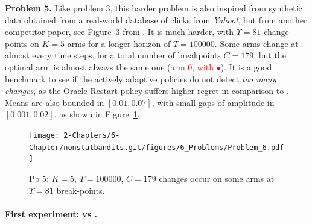\textbf{Problem 5.}
%
Like problem $3$, this harder problem is also inspired from synthetic data obtained from a real-world database of clicks from \emph{Yahoo!}, but from another competitor paper, see Figure~3 from \cite{LiuLeeShroff17}.
%
It is much harder, with $\Upsilon=81$ change-points on $K=5$ arms for a longer horizon of $T=100000$.
Some arms change at almost every time steps, for a total number of breakpoints $C=179$, but the optimal arm is almost always the same one (\textcolor{red}{arm $0$, with $\bullet$}).
It is a good benchmark to see if the actively adaptive policies do not detect \emph{too many changes}, as the Oracle-Restart policy suffers higher regret in comparison to \klUCB.
Means are also bounded in $[0.01, 0.07]$, with small gaps of amplitude in $[0.001, 0.02]$,
as shown in Figure~\ref{fig:6:Problem_6}.

\begin{figure}[h!]  %
    \centering
    \texttt{[image: 2-Chapters/6-Chapter/nonstatbandits.git/figures/6\_Problems/Problem\_6.pdf]}
    \caption{Pb $5$: $K=5$, $T=100000$, $C=179$ changes occur on some arms at $\Upsilon=81$ break-points.}
    \label{fig:6:Problem_6}
\end{figure}





\paragraph{First experiment: \UCB{} vs \klUCB{}.}
%


